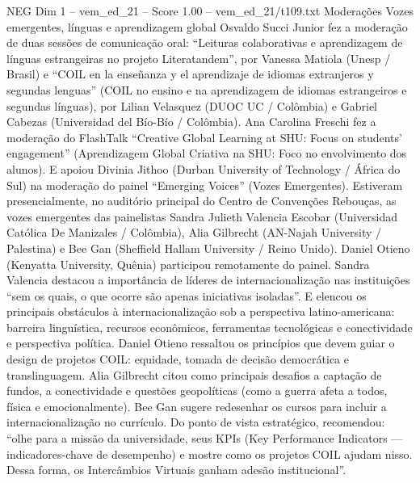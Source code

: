 \begin{textsample}{NEG Dim 1 – vem\_ed\_21 – Score 1.00 – vem\_ed\_21/t109.txt}  \label{ex:f1_neg_053}
Moderações Vozes emergentes, línguas e aprendizagem global Osvaldo Succi Junior fez a moderação de duas sessões de comunicação oral: “Leituras colaborativas e aprendizagem de línguas estrangeiras no projeto Literatandem”, por Vanessa Matiola (Unesp / Brasil) e “COIL en la enseñanza y el aprendizaje de idiomas extranjeros y segundas lenguas” (COIL no ensino e na aprendizagem de idiomas estrangeiros e segundas línguas), por Lilian Velasquez (DUOC UC / Colômbia) e Gabriel Cabezas (Universidad del Bío-Bío / Colômbia).
Ana Carolina Freschi fez a moderação do FlashTalk “Creative Global Learning at SHU: Focus on students’ engagement” (Aprendizagem Global Criativa na SHU: Foco no envolvimento dos alunos).
E apoiou Divinia Jithoo (Durban University of Technology / África do Sul) na moderação do painel “Emerging Voices” (Vozes Emergentes).
Estiveram presencialmente, no auditório principal do Centro de Convenções Rebouças, as vozes emergentes das painelistas Sandra Julieth Valencia Escobar (Universidad Católica De Manizales / Colômbia), Alia Gilbrecht (AN-Najah University / Palestina) e Bee Gan (Sheffield Hallam University / Reino Unido).
Daniel Otieno (Kenyatta University, Quênia) participou remotamente do painel.
Sandra Valencia destacou a importância de líderes de internacionalização nas instituições “sem os quais, o que ocorre são apenas iniciativas isoladas”.
E elencou os principais obstáculos à internacionalização sob a perspectiva latino-americana: barreira linguística, recursos econômicos, ferramentas tecnológicas e conectividade e perspectiva política.
Daniel Otieno ressaltou os princípios que devem guiar o design de projetos COIL: equidade, tomada de decisão democrática e translinguagem.
Alia Gilbrecht citou como principais desafios a captação de fundos, a conectividade e questões geopolíticas (como a guerra afeta a todos, física e emocionalmente).
Bee Gan sugere redesenhar os cursos para incluir a internacionalização no currículo.
Do ponto de vista estratégico, recomendou: “olhe para a missão da universidade, seus KPIs (Key Performance Indicators — indicadores-chave de desempenho) e mostre como os projetos COIL ajudam nisso.
Dessa forma, os Intercâmbios Virtuais ganham adesão institucional”.

\end{textsample}
